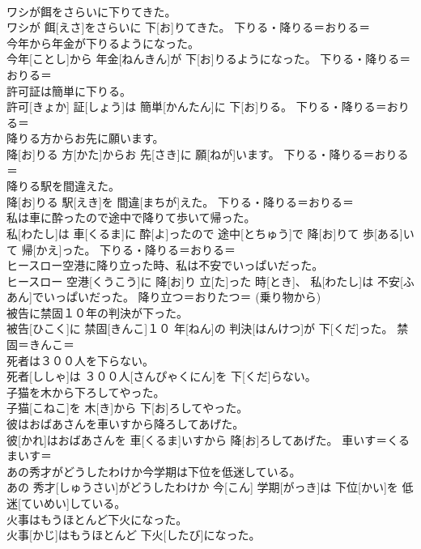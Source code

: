 \documentclass[8pt]{extreport}
\begin{document}
\begin{CJK}{UTF8}{min}
{\\	ワシが餌をさらいに下りてきた。	
\\	ワシが 餌[えさ]をさらいに 下[お]りてきた。	下りる・降りる＝おりる＝ 
\\	今年から年金が下りるようになった。	
\\	今年[ことし]から 年金[ねんきん]が 下[お]りるようになった。	下りる・降りる＝おりる＝ 
\\	許可証は簡単に下りる。	
\\	許可[きょか] 証[しょう]は 簡単[かんたん]に 下[お]りる。	下りる・降りる＝おりる＝ 
\\	降りる方からお先に願います。	
\\	降[お]りる 方[かた]からお 先[さき]に 願[ねが]います。	下りる・降りる＝おりる＝ 
\\	降りる駅を間違えた。	
\\	降[お]りる 駅[えき]を 間違[まちが]えた。	下りる・降りる＝おりる＝ 
\\	私は車に酔ったので途中で降りて歩いて帰った。	
\\	私[わたし]は 車[くるま]に 酔[よ]ったので 途中[とちゅう]で 降[お]りて 歩[ある]いて 帰[かえ]った。	下りる・降りる＝おりる＝ 
\\	ヒースロー空港に降り立った時、私は不安でいっぱいだった。	
\\	ヒースロー 空港[くうこう]に 降[お]り 立[た]った 時[とき]、 私[わたし]は 不安[ふあん]でいっぱいだった。	降り立つ＝おりたつ＝ (乗り物から) 
\\	被告に禁固１０年の判決が下った。	
\\	被告[ひこく]に 禁固[きんこ]１０ 年[ねん]の 判決[はんけつ]が 下[くだ]った。	禁固＝きんこ＝ 
\\	死者は３００人を下らない。	
\\	死者[ししゃ]は ３００人[さんぴゃくにん]を 下[くだ]らない。	
\\	子猫を木から下ろしてやった。	
\\	子猫[こねこ]を 木[き]から 下[お]ろしてやった。	
\\	彼はおばあさんを車いすから降ろしてあげた。	
\\	彼[かれ]はおばあさんを 車[くるま]いすから 降[お]ろしてあげた。	車いす＝くるまいす＝ 
\\	あの秀才がどうしたわけか今学期は下位を低迷している。	
\\	あの 秀才[しゅうさい]がどうしたわけか 今[こん] 学期[がっき]は 下位[かい]を 低迷[ていめい]している。	
\\	火事はもうほとんど下火になった。	
\\	火事[かじ]はもうほとんど 下火[したび]になった。	
}
\end{CJK}
\end{document}
